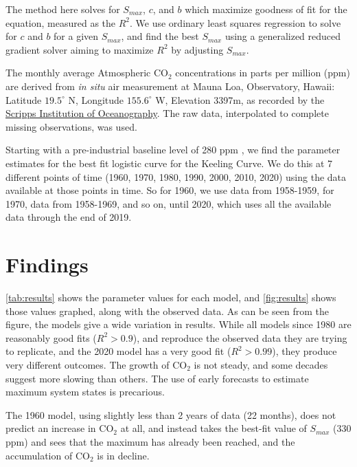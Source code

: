 \documentclass{article}
\begin{document}
The method here solves for $S_{max}$, $c$, and $b$ which maximize goodness of fit for the equation, measured as the $R^2$. We use ordinary least squares regression to solve for $c$ and $b$ for a given $S_{max}$, and find the best $S_{max}$ using a generalized reduced gradient solver aiming to maximize $R^2$ by adjusting $S_{max}$.

The monthly average Atmospheric $\mathrm{CO_{2}}$ concentrations in parts per million (ppm) are derived from \textit{in situ} air measurement at Mauna Loa, Observatory, Hawaii: Latitude $19.5^{\circ}$ N, Longitude $155.6^{\circ}$ W, Elevation 3397m, as recorded by the  \href{https://scrippsco2.ucsd.edu/assets/data/atmospheric/stations/in_situ_co2/monthly/monthly_in_situ_co2_mlo.csv}{Scripps Institution of Oceanography}. The raw data, interpolated to complete missing observations, was used.

Starting with a pre-industrial baseline level of 280 ppm \citep{etheridge1998historical}, we find the parameter estimates for the best fit logistic curve for the Keeling Curve. We do this at 7 different points of time (1960, 1970, 1980, 1990, 2000, 2010, 2020) using the data available at those points in time. So for 1960, we use data from 1958-1959, for 1970, data from 1958-1969, and so on, until 2020, which uses all the available data through the end of 2019. 

   

 
\section{Findings}

\autoref{tab:results} shows the parameter values for each model, and \autoref{fig:results} shows those values graphed, along with the observed data. As can be seen from the figure, the models give a wide variation in results. While all models since 1980 are reasonably good fits ($R^2  > 0.9$), and reproduce the observed data they are trying to replicate, and the 2020 model has a very good fit ($R^2 > 0.99$), they produce very different outcomes. The growth of $\mathrm{CO_{2}}$ is not steady, and some decades suggest more slowing than others. The use of early forecasts to estimate maximum system states is precarious.

The 1960 model, using slightly less than 2 years of data (22 months), does not predict an increase in $\mathrm{CO_{2}}$ at all, and instead takes the best-fit value of $S_{max}$ (330 ppm) and sees that the maximum has already been reached, and the accumulation of $\mathrm{CO_{2}}$ is in decline.
\end{document}
